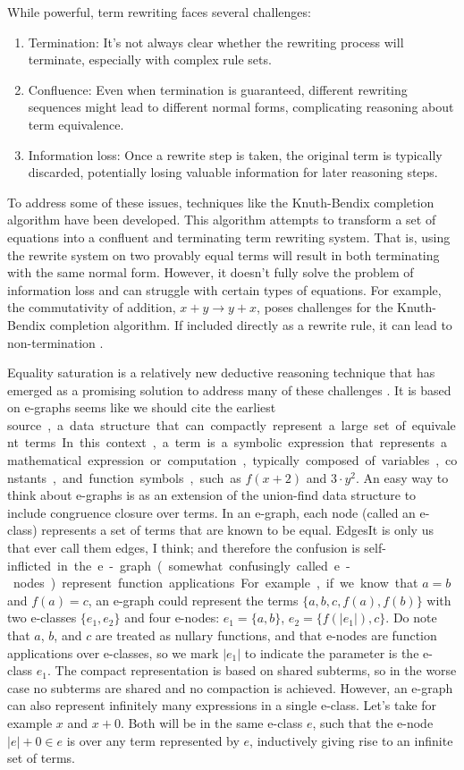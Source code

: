 While powerful, term rewriting faces several challenges:
\begin{enumerate}
    \item Termination: It's not always clear whether the rewriting process will terminate, especially with complex rule sets.
    \item Confluence: Even when termination is guaranteed, different rewriting sequences might lead to different normal forms, complicating reasoning about term equivalence.
    \item Information loss: Once a rewrite step is taken, the original term is typically discarded, potentially losing valuable information for later reasoning steps.
\end{enumerate}

To address some of these issues, techniques like the Knuth-Bendix completion algorithm \cite{knuthbendixcompletion} have been developed. 
This algorithm attempts to transform a set of equations into a confluent and terminating term rewriting system. 
That is, using the rewrite system on two provably equal terms will result in both terminating with the same normal form.
However, it doesn't fully solve the problem of information loss and can struggle with certain types of equations. 
For example, the commutativity of addition, $x + y \rightarrow y + x$, poses challenges for the Knuth-Bendix completion algorithm. 
If included directly as a rewrite rule, it can lead to non-termination \cite{kapur1985knuthintro}.

Equality saturation is a relatively new deductive reasoning technique that has emerged as a promising solution to address many of these challenges \cite{eqsat}. 
It is based on e-graphs \cite{egg}\SI{seems like we should cite the earliest source}, a data structure that can compactly represent a large set of equivalent terms.
In this context, a term is a symbolic expression that represents a mathematical expression or computation, typically composed of variables, constants, and function symbols, such as  $f(x+2)$ and $3 \cdot y^2$.
An easy way to think about e-graphs is as an extension of the union-find data structure to include congruence closure over terms.
In an e-graph, each node (called an e-class) represents a set of terms that are known to be equal.
Edges\SI{It is only us that ever call them edges, I think; and therefore the confusion is self-inflicted} in the e-graph (somewhat confusingly called e-nodes) represent function applications.
For example, if we know that $a = b$ and $f(a) = c$, an e-graph could represent the terms $\{ a, b, c, f(a), f(b) \}$ with two e-classes $\{ e_1, e_2 \}$ and four e-nodes: $e_1  = \{a, b\}$, $e_2 = \{f(|e_1|), c\}$.
Do note that $a$, $b$, and $c$ are treated as nullary functions, and that e-nodes are function applications over e-classes, so we mark $|e_1|$ to indicate the parameter is the e-class $e_1$.
The compact representation is based on shared subterms, so in the worse case no subterms are shared and no compaction is achieved.
However, an e-graph can also represent infinitely many expressions in a single e-class.
Let's take for example $x$ and $x + 0$.
Both will be in the same e-class $e$, such that the e-node $|e| + 0\in e$ is over any term represented by $e$, inductively giving rise to an infinite set of terms.

